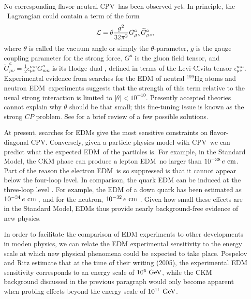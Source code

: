 No corresponding flavor-neutral \gls{CPV}\ has been observed yet. In principle,
the \QCD\ Lagrangian could contain a term of the form
\cite[eqn~1]{pospelov1999theta}
%
\begin{equation}
   \mathcal{L} = \theta
   \frac{g^2}{32\pi^2}G_{\mu\nu}^a\widetilde{G}^a_{\mu\nu},
\end{equation}
%
where $\theta$ is called the vacuum angle or simply the $\theta$-parameter, $g$
is the gauge coupling parameter for the strong force, $G^a$ is the gluon field
tensor, and $\widetilde{G}^a_{\mu\nu}=\frac12\epsilon^{mn}_{\mu\nu}G^a_{mn}$ is
its Hodge dual \cite[eqn~2.82]{carroll2004spacetime}, defined in terms of the
Levi-Civita tensor $\epsilon^{mn}_{\mu\nu}$. Experimental evidence from searches
for the \gls{EDM} of neutral $^{199}$Hg atoms \cite{graner2016reduced} and
neutron \gls{EDM}\ experiments \cite{baker2006improved} suggests that the
strength of this term relative to the usual strong interaction is limited to
$|\theta|<10^{-10}$. Presently accepted theories cannot explain why $\theta$
should be that small; this fine-tuning issue is known as the strong $CP$
problem. See \cite{graham2015experimental} for a brief review of a few possible
solutions.

At present, searches for \glspl{EDM} give the most sensitive constraints on
flavor-diagonal \gls{CPV}. Conversely, given a particle physics model with
\gls{CPV}\ we can predict what the expected \gls{EDM}\ of the particles is. For
example, in the Standard Model, the \gls{CKM} phase can produce a lepton
\gls{EDM}\ no larger than $10^{-38}\,e~\mathrm{cm}$. Part of the reason the electron
\gls{EDM}\ is so suppressed is that it cannot appear below the four-loop level.
\cite{pospelov1991electric} In comparison, the quark \gls{EDM} can be induced at
the three-loop level \cite[sect~4.1.1]{pospelov2005electric}. For example, the
\gls{EDM} of a down quark has been estimated as $10^{-34}\,e~\mathrm{cm}$
\cite[eqn~4.75]{pospelov2005electric}, and for the neutron, $10^{-32}\,e~\mathrm{cm}$
\cite[eqn~4.76]{pospelov2005electric}. Given how small these effects are in the
Standard Model, \glspl{EDM} thus provide nearly background-free evidence of new
physics.

In order to facilitate the comparison of \gls{EDM} experiments to other
developments in moden physics, we can relate the \gls{EDM} experimental
sensitivity to the energy scale at which new physical phenomena could be
expected to take place. Pospelov and Ritz
\cite[sect~4.1.3]{pospelov2005electric} estimate that at the time of their
writing (2005), the experimental \gls{EDM} sensitivity corresponds to an energy
scale of $10^{6}~\mathrm{GeV}$, while the \gls{CKM} background discussed in the previous
paragraph would only become apparent when probing effects beyond the energy
scale of $10^{11}~\mathrm{GeV}$.

